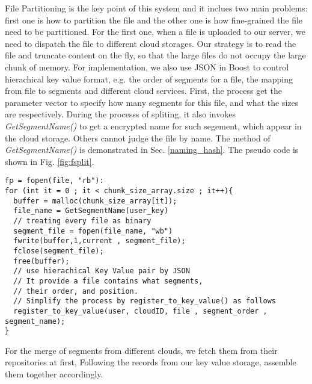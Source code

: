 

File Partitioning is the key point of this system and it inclues two main 
problems: first one is how to partition the file and the 
other one is how fine-grained the file need to be partitioned.
For the first one, 
when a file is uploaded to our server, we need to dispatch the file to different
cloud storages. Our strategy is to read the 
file and truncate content on the fly, so that
the large files do not occupy the large chunk of memory.
For implementation, we also use JSON in Boost to  
control hierachical key value format, e.g. the order of segments for a file,
the mapping from file to segments and different cloud services.
First, the process get the parameter vector to specify how many segments for this
file, and what the sizes are respectively.
During the processs of spliting, it also invokes \emph{GetSegmentName()} to get a 
encrypted name for such segement, which appear in the cloud storage. Others cannot 
judge the file by name. The method of \emph{GetSegmentName()} is demonstrated in Sec. \ref{naming_hash}.
The pseudo code is shown in Fig. \ref{fig:fsplit}.

\begin{figure*}[hbt]
\centering
\begin{lstlisting}
fp = fopen(file, "rb"):
for (int it = 0 ; it < chunk_size_array.size ; it++){
  buffer = malloc(chunk_size_array[it]);
  file_name = GetSegmentName(user_key)
  // treating every file as binary 
  segment_file = fopen(file_name, "wb")
  fwrite(buffer,1,current , segment_file);
  fclose(segment_file);
  free(buffer);
  // use hierachical Key Value pair by JSON 
  // It provide a file contains what segments,
  // their order, and position.
  // Simplify the process by register_to_key_value() as follows
  register_to_key_value(user, cloudID, file , segment_order , segment_name);
}
\end{lstlisting}
\caption{Pesudo Code of File Spliting}
\label{fig:fsplit}
\end{figure*}

For the merge of segments from different clouds, we fetch them from their repositories at first, 
Following the records from our key value storage, assemble them together accordingly.

